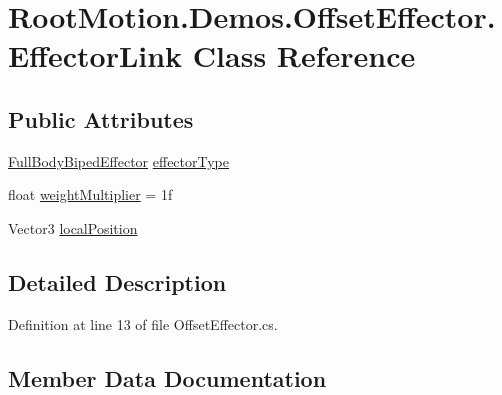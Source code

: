 \hypertarget{class_root_motion_1_1_demos_1_1_offset_effector_1_1_effector_link}{}\section{Root\+Motion.\+Demos.\+Offset\+Effector.\+Effector\+Link Class Reference}
\label{class_root_motion_1_1_demos_1_1_offset_effector_1_1_effector_link}
\subsection*{Public Attributes}
\begin{DoxyCompactItemize}
\item 
\mbox{\hyperlink{namespace_root_motion_1_1_final_i_k_ae0dd2058c7667b6f132c11a6b860c14a}{Full\+Body\+Biped\+Effector}} \mbox{\hyperlink{class_root_motion_1_1_demos_1_1_offset_effector_1_1_effector_link_ae8a42424a28437c770e310c344e9220c}{effector\+Type}}
\item 
float \mbox{\hyperlink{class_root_motion_1_1_demos_1_1_offset_effector_1_1_effector_link_a60299be7c6de08ea7c8e805d66354729}{weight\+Multiplier}} = 1f
\item 
Vector3 \mbox{\hyperlink{class_root_motion_1_1_demos_1_1_offset_effector_1_1_effector_link_a3c689aa0dbe3d763c7190651886acbf2}{local\+Position}}
\end{DoxyCompactItemize}


\subsection{Detailed Description}


Definition at line 13 of file Offset\+Effector.\+cs.



\subsection{Member Data Documentation}
\mbox{\label{class_root_motion_1_1_demos_1_1_offset_effector_1_1_effector_link_ae8a42424a28437c770e310c344e9220c}} 
